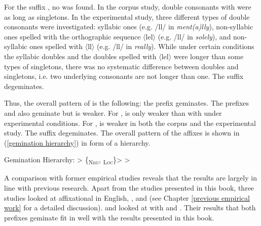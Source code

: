For the suffix , no  was found. In the corpus study, double consonants with  were as long as singletons. In the experimental study, three different types of double consonants were investigated: syllabic ones (e.g. /ll/ in  \textit{ment(a)lly}), non-syllabic ones spelled with the orthographic sequence $\langle$lel$\rangle$ (e.g. /ll/ in \textit{solely}), and non-syllabic ones spelled with $\langle$ll$\rangle$ (e.g. /ll/ in \textit{really}). While under certain conditions the syllabic doubles and the doubles spelled with $\langle$lel$\rangle$ were longer than some types of singletons, there was no systematic difference between doubles and singletons, i.e. two underlying consonants are not longer than one. The suffix  degeminates.



Thus, the overall pattern of  is the following: the prefix  geminates. The prefixes  and   also geminate but  is weaker. For ,  is only weaker than  with  under experimental conditions. For ,  is weaker in both the corpus and the experimental study. The suffix  degeminates. The overall  pattern of the affixes is shown in (\ref{gemination hierarchy}) in form of a hierarchy.


\begin{exe}
	
	\ex \label{gemination hierarchy} {Gemination Hierarchy}: \hspace*{0.5cm}	{ > \{\textsubscript{\textsc{Neg}},  \textsubscript{\textsc{Loc}}\}>  > }
	
\end{exe}


A comparison with former empirical studies reveals that the results are largely in line with previous research. 
Apart from the studies presented in this book, three studies looked at affixational  in English, \cite{Kaye.2005}, \cite{Oh.2012} and \cite{Kotzor.2016} (see Chapter \ref{previous empirical work} for a detailed discussion). 
\cite{Kaye.2005} and \cite{Oh.2012} looked at  with  and . Their results that both prefixes geminate fit in well with the results presented in this book.

